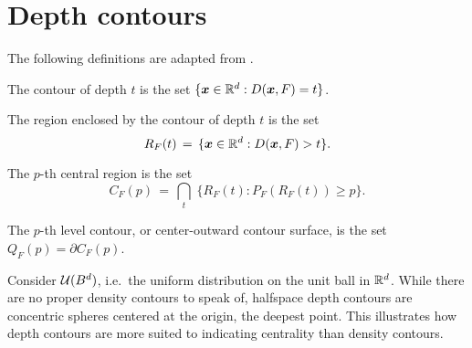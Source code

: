 \section{Depth contours}

The following definitions are adapted from \cite{liu-parelius-singh-1999}.

\begin{definition}
    The contour of depth $t$ is the set $\{\bm{x} \in \mathbb{R}^d : D(\bm{x}, F) = t\}$.
\end{definition}

\begin{definition}
    The region enclosed by the contour of depth $t$ is the set
    \begin{equation}
        R_F(t) \,=\, \{\bm{x} \in \mathbb{R}^d : D(\bm{x}, F) > t\}.
    \end{equation}
\end{definition}

\begin{definition}
    The $p$-th central region is the set
    \begin{equation}
        C_F(p) \,=\, \bigcap_{t}\; \{R_F(t) : P_F(R_F(t)) \geq p\}.
    \end{equation}
\end{definition}

\begin{definition}
    The $p$-th level contour, or center-outward contour surface, is the set
    $Q_F(p) = \partial C_F(p)$.
\end{definition}


\begin{example}
    Consider $\mathcal{U}(B^d)$, i.e.\ the uniform distribution on the unit ball in
    $\mathbb{R}^d$.
    While there are no proper density contours to speak of, halfspace depth
    contours are concentric spheres centered at the origin, the deepest point.
    This illustrates how depth contours are more suited to indicating
    centrality than density contours.
\end{example}


